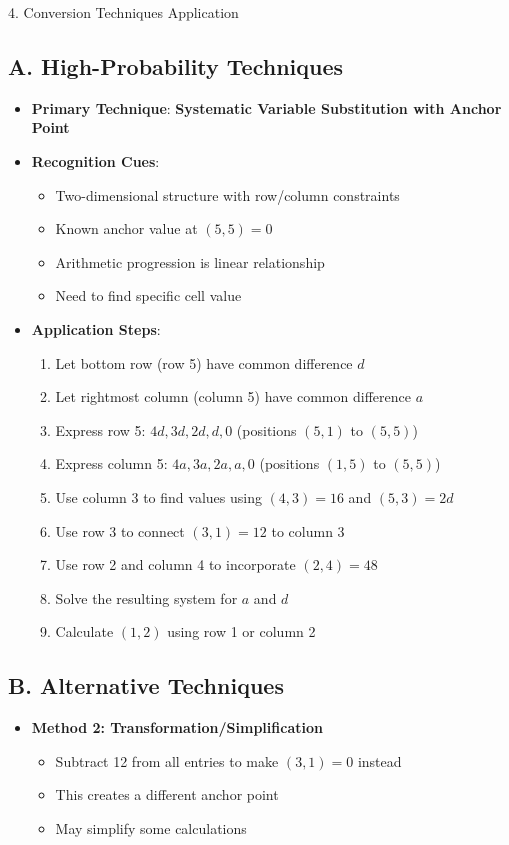 \documentclass[12pt]{article}
\begin{document}
\begin{conversionbox}{4. Conversion Techniques Application}

\subsection*{A. High-Probability Techniques}
\begin{itemize}[leftmargin=*]
    \item \textbf{Primary Technique}: \textbf{Systematic Variable Substitution with Anchor Point}
    
    \item \textbf{Recognition Cues}:
    \begin{itemize}
        \item Two-dimensional structure with row/column constraints
        \item Known anchor value at $(5,5) = 0$
        \item Arithmetic progression is linear relationship
        \item Need to find specific cell value
    \end{itemize}
    
    \item \textbf{Application Steps}:
    \begin{enumerate}
        \item Let bottom row (row 5) have common difference $d$
        \item Let rightmost column (column 5) have common difference $a$
        \item Express row 5: $4d, 3d, 2d, d, 0$ (positions $(5,1)$ to $(5,5)$)
        \item Express column 5: $4a, 3a, 2a, a, 0$ (positions $(1,5)$ to $(5,5)$)
        \item Use column 3 to find values using $(4,3) = 16$ and $(5,3) = 2d$
        \item Use row 3 to connect $(3,1) = 12$ to column 3
        \item Use row 2 and column 4 to incorporate $(2,4) = 48$
        \item Solve the resulting system for $a$ and $d$
        \item Calculate $(1,2)$ using row 1 or column 2
    \end{enumerate}
\end{itemize}

\subsection*{B. Alternative Techniques}
\begin{itemize}[leftmargin=*]
    \item \textbf{Method 2: Transformation/Simplification}
    \begin{itemize}
        \item Subtract 12 from all entries to make $(3,1) = 0$ instead
        \item This creates a different anchor point
        \item May simplify some calculations
    \end{itemize}
    

\end{itemize}
\end{conversionbox}
\end{document}
